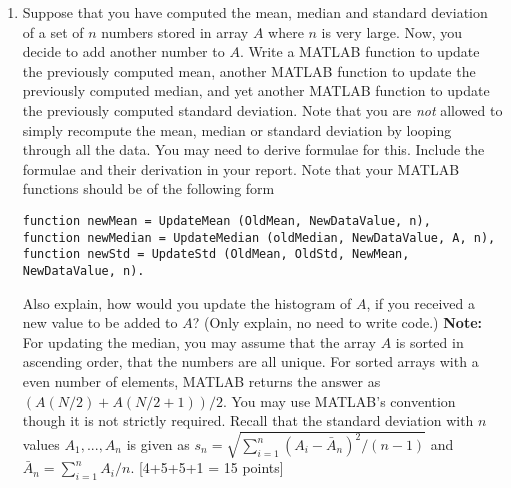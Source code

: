 \documentclass[11pt]{article}
\begin{document}
\begin{enumerate}
\item Suppose that you have computed the mean, median and standard deviation of a set of $n$ numbers stored in array $A$ where $n$ is very large. Now, you decide to add another number to $A$. Write a MATLAB function to update the previously computed mean, another MATLAB function to update the previously computed median, and yet another MATLAB function to update the previously computed standard deviation. Note that you are \emph{not} allowed to simply recompute the mean, median or standard deviation by looping through all the data. You may need to derive formulae for this. Include the formulae and their derivation in your report. Note that your MATLAB functions should be of the following form
\begin{verbatim}
function newMean = UpdateMean (OldMean, NewDataValue, n),  
function newMedian = UpdateMedian (oldMedian, NewDataValue, A, n), 
function newStd = UpdateStd (OldMean, OldStd, NewMean, NewDataValue, n).\end{verbatim} 
Also explain, how would you update the histogram of $A$, if you received a new value to be added to $A$? (Only explain, no need to write code.)
\textbf{Note:} For updating the median, you may assume that the array $A$ is sorted in ascending order, that the numbers are all unique. For sorted arrays with a even number of elements, MATLAB returns the answer as $(A(N/2)+A(N/2+1))/2$. You may use MATLAB's convention though it is not strictly required. Recall that the standard deviation with $n$ values $A_1,...,A_n$ is given as $s_n = \sqrt{\sum_{i=1}^n (A_i-\bar{A}_n)^2/(n-1)}$ and $\bar{A}_n = \sum_{i=1}^n A_i / n $. 
\textsf{[4+5+5+1 = 15 points]}

\end{enumerate}
\end{document}
